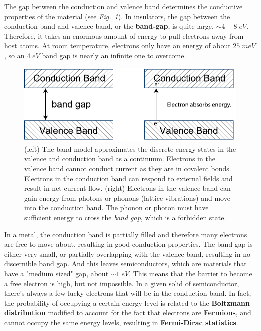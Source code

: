The gap between the conduction and valence band determines the conductive properties of the material (see \emph{Fig.~\ref{fig:slide24b}}).  In insulators, the gap between the conduction band and valence band, or the \textbf{band-gap}, is quite large,  $\sim 4-8\;eV$.  Therefore, it takes an enormous amount of energy to pull electrons away from host atoms.  At room temperature, electrons only have an energy of about $25\;meV$, so an $4\;eV$ band gap is nearly an infinite one to overcome.
\vspace{0.25cm}
\begin{figure}[H]
\centering
\includegraphics[width=.65\columnwidth]{energybands.pdf} 
\caption{(left) The band model approximates the discrete energy states in the valence and conduction band as a continuum.  Electrons in the valence band cannot conduct current as they are in covalent bonds.  Electrons in the conduction band can respond to external fields and result in net current flow.  (right)  Electrons in the valence band can gain energy from photons or phonons (lattice vibrations) and move into the conduction band.  The phonon or photon must have sufficient energy to cross the \emph{band gap}, which is a forbidden state.}
\label{fig:slide24b}
\end{figure}

In a metal, the conduction band is partially filled and therefore many electrons are free to move about, resulting in good conduction properties.  The band gap is either very small, or partially overlapping with the valence band, resulting in no discernible band gap.  And this leaves semiconductors, which are materials that have a "medium sized" gap, about $\sim 1\;eV$.  This means that the barrier to become a free electron is high, but not impossible.  In a given solid of semiconductor, there's always a few lucky electrons that will be in the conduction band.  In fact, the probability of occupying  a certain energy level is related to the \textbf{Boltzmann distribution} modified to account for the fact that electrons are \textbf{Fermions}, and cannot occupy the same energy levels, resulting in \textbf{Fermi-Dirac statistics}.

